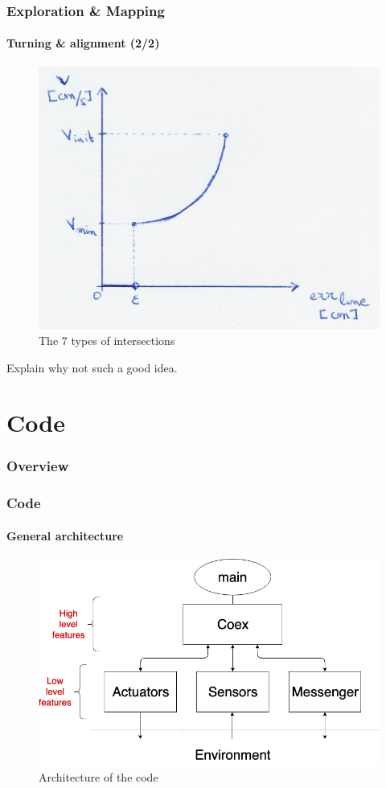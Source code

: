 \documentclass[10pt]{beamer}
\begin{document}
\begin{frame}
\frametitle{Exploration \& Mapping}
\framesubtitle{Turning \& alignment (2/2)}
\begin{figure}[hbtp]
\centering
\label{fig:type-intersection}
\includegraphics[scale=0.07]{figures/turn-align}
\caption{The 7 types of intersections}
\end{figure}
Explain why not such a good idea.
\end{frame}

\section{Code} 

\begin{frame}
\frametitle{Overview}
\tableofcontents[currentsection,subsectionstyle=shaded]
\end{frame}

\begin{frame}
\frametitle{Code}
\framesubtitle{General architecture}
\begin{figure}[hbtp]
\centering
\label{fig:architecture}
\includegraphics[scale=0.38]{figures/architecture.png}
\caption{Architecture of the code}
\end{figure}
\end{frame}
\end{document}
